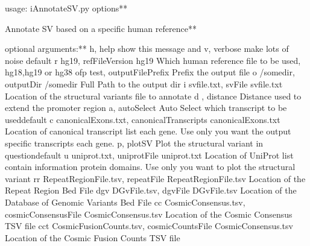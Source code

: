 \documentclass[letterpaper,10pt,english]{sphinxmanual}
\begin{document}
%
\begin{sphinxVerbatim}[commandchars=\\\{\}]
usage: iAnnotateSV.py \PYG{o}{[}options\PYG{o}{]}**

Annotate SV based on a specific human reference**

optional arguments:**
\PYGZhy{}h, \PYGZhy{}\PYGZhy{}help            show this  message and 
\PYGZhy{}v, \PYGZhy{}\PYGZhy{}verbose         make lots of noise \PYG{o}{[}default\PYG{o}{]}
\PYGZhy{}r hg19, \PYGZhy{}\PYGZhy{}refFileVersion hg19
                        Which human reference file to be used, hg18,hg19 or
                        hg38
\PYGZhy{}ofp test, \PYGZhy{}\PYGZhy{}outputFilePrefix 
                        Prefix  the output file
\PYGZhy{}o /somedir, \PYGZhy{}\PYGZhy{}outputDir /somedir
                        Full Path to the output dir
\PYGZhy{}i svfile.txt, \PYGZhy{}\PYGZhy{}svFile svfile.txt
                        Location of the structural variants file to annotate
\PYGZhy{}d , \PYGZhy{}\PYGZhy{}distance 
                        Distance used to extend the promoter region
\PYGZhy{}a, \PYGZhy{}\PYGZhy{}autoSelect      Auto Select which transcript to be used\PYG{o}{[}default\PYG{o}{]}
\PYGZhy{}c canonicalExons.txt, \PYGZhy{}\PYGZhy{}canonicalTranscripts canonicalExons.txt
                        Location of canonical transcript list  each gene.
                        Use only  you want the output  specific
                        transcripts  each gene.
\PYGZhy{}p, \PYGZhy{}\PYGZhy{}plotSV          Plot the structural variant in question\PYG{o}{[}default\PYG{o}{]}
\PYGZhy{}u uniprot.txt, \PYGZhy{}\PYGZhy{}uniprotFile uniprot.txt
                        Location of UniProt list contain information 
                        protein domains. Use only  you want to plot the
                        structural variant
\PYGZhy{}rr RepeatRegionFile.tsv, \PYGZhy{}\PYGZhy{}repeatFile RepeatRegionFile.tsv
                        Location of the Repeat Region Bed File
\PYGZhy{}dgv DGvFile.tsv, \PYGZhy{}\PYGZhy{}dgvFile DGvFile.tsv
                        Location of the Database of Genomic Variants Bed File
\PYGZhy{}cc CosmicConsensus.tsv, \PYGZhy{}\PYGZhy{}cosmicConsensusFile CosmicConsensus.tsv
                        Location of the Cosmic Consensus TSV file
\PYGZhy{}cct CosmicFusionCounts.tsv, \PYGZhy{}\PYGZhy{}cosmicCountsFile CosmicConsensus.tsv
                        Location of the Cosmic Fusion Counts TSV file
\end{sphinxVerbatim}
\end{document}
